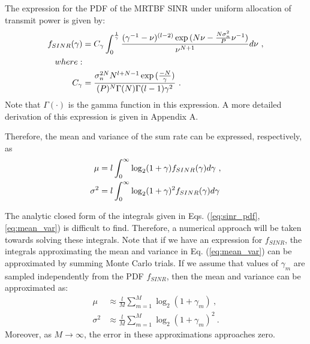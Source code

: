 The expression for the PDF of the MRTBF SINR under uniform allocation of transmit power is given by:
\begin{equation}
    \begin{aligned}\label{eq:sinr_pdf}
        f_{\small{SINR}}(\gamma) &= C_\gamma \int_0^{\frac{1}{\gamma}}\frac{(\gamma^{-1}-\nu)^{(l-2)}\exp{(N\nu-\frac{N\sigma_n^2}{P}\nu^{-1})}}{\nu^{N+1}}d\nu \ ,\\
        where:\\
        C_\gamma &= \frac{\sigma_n^{2N}N^{l+N-1}\exp{(\frac{-N}{\gamma})}}{(P)^{N}\Gamma(N)\Gamma(l-1)\gamma^2} \ .
    \end{aligned}
\end{equation}
Note that $\Gamma(\cdot)$ is the gamma function in this expression. A more detailed derivation of this expression is given in Appendix A.

Therefore, the mean and variance of the sum rate can be expressed, respectively, as
\begin{equation}\label{eq:mean_var}
    \begin{aligned}
        \mu &= l \int_0^\infty \log_2(1+\gamma)f_{\small{SINR}}(\gamma)d\gamma \ , \\
        \sigma^2 &= l \int_0^\infty \log_2(1+\gamma)^2f_{\small{SINR}}(\gamma)d\gamma
    \end{aligned}
\end{equation}

The analytic closed form of the integrals given in Eqs. (\ref{eq:sinr_pdf},\ref{eq:mean_var}) is difficult to find. Therefore, a numerical approach will be taken towards solving these integrals. Note that if we have an expression for $f_{SINR}$, the integrals approximating the mean and variance in Eq. (\ref{eq:mean_var}) can be approximated by summing Monte Carlo trials. If we assume that values of $\gamma_{m}$ are sampled independently from the PDF $f_{SINR}$, then the mean and variance can be approximated as:
\begin{equation}\label{eq:mean_var_approx}
    \begin{aligned}
        \mu &\approx \frac{l}{M} \sum_{m=1}^M \log_2(1+\gamma_m)\ , \\
        \sigma^2 &\approx \frac{l}{M} \sum_{m=1}^M \log_2(1+\gamma_m)^2\ .
    \end{aligned}
\end{equation}
Moreover, as $M\rightarrow\infty$, the error in these approximations approaches zero.
